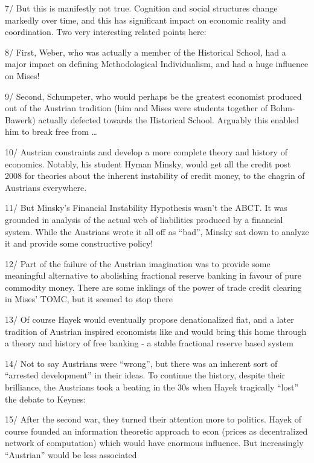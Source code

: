 \documentclass[
]{book}
\begin{document}
7/ But this is manifestly not true. Cognition and social structures change markedly over time, and this has significant impact on economic reality and coordination. Two very interesting related points here:

8/ First, Weber, who was actually a member of the Historical School, had a major impact on defining Methodological Individualism, and had a huge influence on Mises!

9/ Second, Schumpeter, who would perhaps be the greatest economist produced out of the Austrian tradition (him and Mises were students together of Bohm-Bawerk) actually defected towards the Historical School. Arguably this enabled him to break free from \ldots{}

10/ Austrian constraints and develop a more complete theory and history of economics. Notably, his student Hyman Minsky, would get all the credit post 2008 for theories about the inherent instability of credit money, to the chagrin of Austrians everywhere.

11/ But Minsky's Financial Instability Hypothesis wasn't the ABCT. It was grounded in analysis of the actual web of liabilities produced by a financial system. While the Austrians wrote it all off as ``bad'', Minsky sat down to analyze it and provide some constructive policy!

12/ Part of the failure of the Austrian imagination was to provide some meaningful alternative to abolishing fractional reserve banking in favour of pure commodity money. There are some inklings of the power of trade credit clearing in Mises' TOMC, but it seemed to stop there

13/ Of course Hayek would eventually propose denationalized fiat, and a later tradition of Austrian inspired economists like \citet{GeorgeSelgin} and \citet{lawrencehwhite1} would bring this home through a theory and history of free banking - a stable fractional reserve based system

14/ Not to say Austrians were ``wrong'', but there was an inherent sort of ``arrested development'' in their ideas. To continue the history, despite their brilliance, the Austrians took a beating in the 30s when Hayek tragically ``lost'' the debate to Keynes:

15/ After the second war, they turned their attention more to politics. Hayek of course founded an information theoretic approach to econ (prices as decentralized network of computation) which would have enormous influence. But increasingly ``Austrian'' would be less associated
\end{document}
